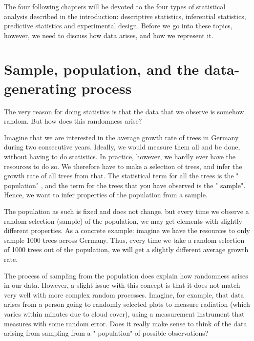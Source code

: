 \documentclass[a4paper,twoside]{tufte-book}\usepackage[]{graphicx}\usepackage[]{color}
\begin{document}
The four following chapters will be devoted to the four types of statistical analysis described in the introduction: descriptive statistics, inferential statistics, predictive statistics and experimental design. Before we go into these topics, however, we need to discuss how data arises, and how we represent it. 

\section{Sample, population, and the data-generating process}

The very reason for doing statistics is that the data that we observe is somehow random. But how does this randomness arise?

Imagine  that we are interested in the average growth rate of trees in Germany during two consecutive years. Ideally, we would measure them all and be done, without having to do statistics. In practice, however, we hardly ever have the resources to do so. We therefore have to make a selection of trees, and infer the growth rate of all trees from that. The statistical term for all the trees is the " population" , and the term for the trees that you have observed is the " sample". Hence, we want to infer properties of the population from a sample.

The  population as such is fixed and does not change, but every time we observe a random selection (sample) of the population, we may get elements with slightly different properties. As a concrete example: imagine we have the resources to only sample 1000 trees across Germany. Thus, every time we take a random selection of 1000 trees out of the population, we will get a slightly different average growth rate.

The process of sampling from the population does explain how randomness arises in our data. However, a slight issue with this concept is that it does not match very well with more complex random processes. Imagine, for example, that data arises from a person going to randomly selected plots to measure radiation (which varies within minutes due to cloud cover), using a measurement instrument that measures with some random error. Does it really make sense to think of the data arising from sampling from a " population" of possible observations?
\end{document}
